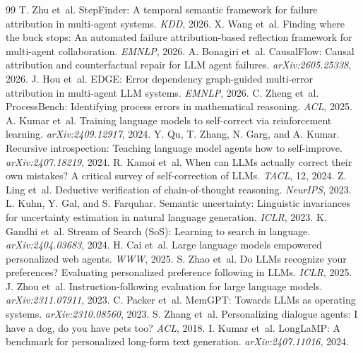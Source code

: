 \documentclass{article}
\begin{document}
\begin{thebibliography}{99}
 T. Zhu et~al. StepFinder: A temporal semantic framework for failure attribution in multi-agent systems. \emph{KDD}, 2026.
 X. Wang et~al. Finding where the buck stops: An automated failure attribution-based reflection framework for multi-agent collaboration. \emph{EMNLP}, 2026.
 A. Bonagiri et~al. CausalFlow: Causal attribution and counterfactual repair for LLM agent failures. \emph{arXiv:2605.25338}, 2026.
 J. Hou et~al. EDGE: Error dependency graph-guided multi-error attribution in multi-agent LLM systems. \emph{EMNLP}, 2026.
 C. Zheng et~al. ProcessBench: Identifying process errors in mathematical reasoning. \emph{ACL}, 2025.
 A. Kumar et~al. Training language models to self-correct via reinforcement learning. \emph{arXiv:2409.12917}, 2024.
 Y. Qu, T. Zhang, N. Garg, and A. Kumar. Recursive introspection: Teaching language model agents how to self-improve. \emph{arXiv:2407.18219}, 2024.
 R. Kamoi et~al. When can LLMs actually correct their own mistakes? A critical survey of self-correction of LLMs. \emph{TACL}, 12, 2024.
 Z. Ling et~al. Deductive verification of chain-of-thought reasoning. \emph{NeurIPS}, 2023.
 L. Kuhn, Y. Gal, and S. Farquhar. Semantic uncertainty: Linguistic invariances for uncertainty estimation in natural language generation. \emph{ICLR}, 2023.
 K. Gandhi et~al. Stream of Search (SoS): Learning to search in language. \emph{arXiv:2404.03683}, 2024.
 H. Cai et~al. Large language models empowered personalized web agents. \emph{WWW}, 2025.
 S. Zhao et~al. Do LLMs recognize your preferences? Evaluating personalized preference following in LLMs. \emph{ICLR}, 2025.
 J. Zhou et~al. Instruction-following evaluation for large language models. \emph{arXiv:2311.07911}, 2023.
 C. Packer et~al. MemGPT: Towards LLMs as operating systems. \emph{arXiv:2310.08560}, 2023.
 S. Zhang et~al. Personalizing dialogue agents: I have a dog, do you have pets too? \emph{ACL}, 2018.
 I. Kumar et~al. LongLaMP: A benchmark for personalized long-form text generation. \emph{arXiv:2407.11016}, 2024.
\end{thebibliography}
\end{document}
